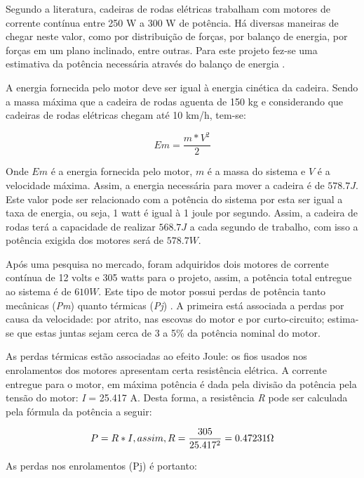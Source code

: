 		Segundo a literatura, cadeiras de rodas elétricas trabalham com motores de corrente contínua entre 250 W a 300 W de potência. Há diversas maneiras de chegar neste valor, como por distribuição de forças, por balanço de energia, por forças em um plano inclinado, entre outras. Para este projeto fez-se uma estimativa da potência necessária através do balanço de energia \cite{acionamento_motores_cadeira}.

		A energia fornecida pelo motor deve ser igual à energia cinética da cadeira. Sendo a massa máxima que a cadeira de rodas aguenta de 150 kg e considerando que cadeiras de rodas elétricas chegam até 10 km/h, tem-se:


		\begin{equation}
			Em = \frac{m*V^2}{2}
		\end{equation}

		Onde $Em$ é a energia fornecida pelo motor, $m$ é a massa do sistema e $V$ é a velocidade máxima. Assim, a energia necessária para mover a cadeira é de $578.7 J$. Este valor pode ser relacionado com a potência do sistema por esta ser igual a taxa de energia, ou seja, 1 watt é igual à 1 joule por segundo. Assim, a cadeira de rodas terá a capacidade de realizar $568.7 J$ a cada segundo de trabalho, com isso a potência exigida dos motores será de $578.7 W$.

		Após uma pesquisa no mercado, foram adquiridos dois motores de corrente contínua de 12 volts e 305 watts para o projeto, assim, a potência total entregue ao sistema é de $610 W$. Este tipo de motor possui perdas de potência tanto mecânicas (\textit{Pm}) quanto térmicas (\textit{Pj}) \cite{perdas}. A primeira está associada a perdas por causa da velocidade: por atrito, nas escovas do motor e por curto-circuito; estima-se que estas juntas sejam cerca de 3 a 5\% da potência nominal do motor.

		As perdas térmicas estão associadas ao efeito Joule: os fios usados nos enrolamentos dos motores apresentam certa resistência elétrica. A corrente entregue para o motor, em máxima potência é dada pela divisão da potência pela tensão do motor: \textit{I} = 25.417 A. Desta forma, a resistência \textit{R} pode ser calculada pela fórmula da potência a seguir:

		\begin{equation}
			P = R*I, assim, R = \frac{305}{25.417^2} = 0.47231 \ohm
		\end{equation}

		As perdas nos enrolamentos (Pj) é portanto:

